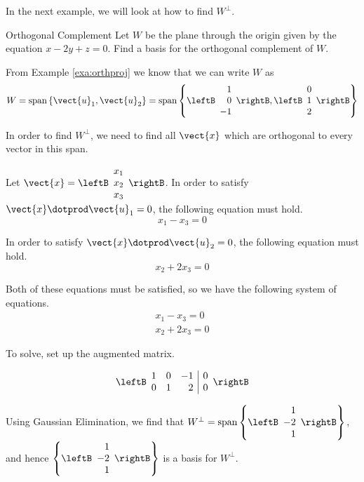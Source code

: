 In the next example, we will look at how to find
$W^{\perp}$.

\begin{example}{Orthogonal Complement}\label{exa:orthcomp}
Let $W$ be the  plane through the origin given by the equation  $x - 2y + z = 0$. Find
a basis for the orthogonal complement of $W$.
\end{example}

\begin{solution}

From Example \ref{exa:orthproj} we know that we can write $W$ as 
\[
W = \mbox{span} \left\{ \vect{u}_1, \vect{u}_2 \right\} = \mbox{span} 
\left\{
\leftB
\begin{array}{r}
1 \\
0 \\
-1
\end{array}
\rightB,
\leftB
\begin{array}{c}
0 \\
1 \\
2
\end{array}
\rightB
\right\}
\]

In order to find $W^{\perp}$, we need to find all $\vect{x}$ which are orthogonal to every vector in this span. 

Let $\vect{x} = \leftB
\begin{array}{c}
x_1 \\
x_2 \\
x_3
\end{array}
\rightB$. 
In order to satisfy $\vect{x} \dotprod \vect{u}_1 = 0$, the following equation must hold. 
\[
x_1 - x_3 = 0
\]

In order to satisfy $\vect{x} \dotprod \vect{u}_2 = 0$, the following equation must hold.
\[
x_2 + 2x_3 = 0 
\]

Both of these equations must be satisfied, so we have the following system of equations. 
\[
\begin{array}{c}
x_1 - x_3 = 0 \\
x_2 + 2x_3 = 0
\end{array}
\]

To solve, set up the augmented matrix. 

\[
\leftB \begin{array}{rrr|r}
1 & 0 & -1 & 0 \\
0 & 1 & 2 & 0 
\end{array} \rightB
\]

Using Gaussian Elimination, we find that $W^{\perp} = \mbox{span} \left\{ \leftB
\begin{array}{r}
1 \\
-2 \\
1
\end{array}
\rightB
\right\}$, and hence 
$\left\{ \leftB
\begin{array}{r}
1 \\
-2 \\
1
\end{array}
\rightB
\right\}$ is a basis for  $W^{\perp}$. 
\end{solution}


